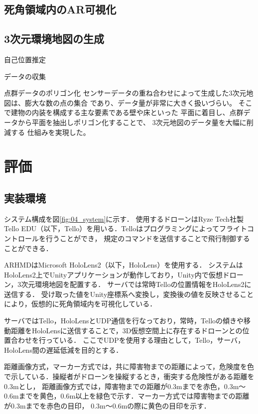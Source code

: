 \documentclass[a4paper,10pt,twocolumn,uplatex]{jsarticle}
\begin{document}
\subsection{死角領域内のAR可視化}

\subsection{3次元環境地図の生成}
自己位置推定

データの収集

点群データのポリゴン化
センサーデータの重ね合わせによって生成した3次元地図は、膨大な数の点の集合 であり、データ量が非常に大きく扱いづらい。
そこで建物の内装を構成する主な要素である壁や床といった 平面に着目し、点群データから平面を抽出しポリゴン化することで、
3次元地図のデータ量を大幅に削減する 仕組みを実現した。

\section{評価}

\subsection{実装環境}
システム構成を図\ref{fig:04_system}に示す．
使用するドローンはRyze Tech社製Tello EDU（以下，Tello）を用いる．Telloはプログラミングによってフライトコントロールを行うことができ，
規定のコマンドを送信することで飛行制御することができる．
\par
ARHMDはMicrosoft HoloLens2（以下，HoloLens）を使用する．
システムはHoloLens2上でUnityアプリケーションが動作しており，Unity内で仮想ドローン，3次元環境地図を配置する．
サーバでは常時Telloの位置情報をHoloLens2に送信する．
受け取った値をUnity座標系へ変換し，変換後の値を反映させることにより，仮想的に死角領域内を可視化している．
\par
サーバではTello，HoloLensとUDP通信を行なっており，常時，Telloの傾きや移動距離をHoloLensに送信することで，3D仮想空間上に存在するドローンとの位置合わせを行っている．
ここでUDPを使用する理由として，Tello，サーバ，HoloLens間の遅延低減を目的とする．
\par
距離画像方式，マーカー方式では，共に障害物までの距離によって，危険度を色で示している．操縦者がドローンを操縦するとき，衝突する危険性がある距離を0.3mとし\cite{Yamada}，
距離画像方式では，障害物までの距離が0.3mまでを赤色，0.3m〜0.6mまでを黄色，0.6m以上を緑色で示す．マーカー方式では障害物までの距離が0.3mまでを赤色の目印，
0.3m〜0.6mの際に黄色の目印を示す．
\end{document}

